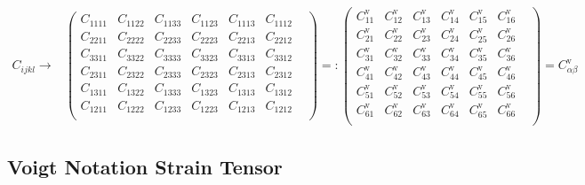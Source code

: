 \documentclass[a4paper, 10pt]{scrartcl}
\begin{document}
	\begin{align} C_{ijkl} \longrightarrow& \begin{pmatrix} C_{1111} & C_{1122} &
			C_{1133} & C_{1123} & C_{1113} & C_{1112} & \\ C_{2211} & C_{2222} & C_{2233} &
			C_{2223} & C_{2213} & C_{2212} & \\ C_{3311} & C_{3322} & C_{3333} & C_{3323} &
			C_{3313} & C_{3312} & \\ C_{2311} & C_{2322} & C_{2333} & C_{2323} & C_{2313} &
			C_{2312} & \\ C_{1311} & C_{1322} & C_{1333} & C_{1323} & C_{1313} & C_{1312} &
			\\ C_{1211} & C_{1222} & C_{1233} & C_{1223} & C_{1213} & C_{1212} & \\
		\end{pmatrix}=: \begin{pmatrix} C_{11}^{\text{v}} & C_{12}^{\text{v}} &
		C_{13}^{\text{v}} & C_{14}^{\text{v}} & C_{15}^{\text{v}} & C_{16}^{\text{v}} &
		\\ C_{21}^{\text{v}} & C_{22}^{\text{v}} & C_{23}^{\text{v}} & C_{24}^{\text{v}}
		&  C_{25}^{\text{v}} & C_{26}^{\text{v}} & \\ C_{31}^{\text{v}} &
		C_{32}^{\text{v}}  & C_{33}^{\text{v}} & C_{34}^{\text{v}} & C_{35}^{\text{v}} &
		C_{36}^{\text{v}} & \\ C_{41}^{\text{v}} & C_{42}^{\text{v}} & C_{43}^{\text{v}}
		& C_{44}^{\text{v}} & C_{45}^{\text{v}} & C_{46}^{\text{v}} & \\
		C_{51}^{\text{v}}  & C_{52}^{\text{v}} & C_{53}^{\text{v}} & C_{54}^{\text{v}} &
		C_{55}^{\text{v}} & C_{56}^{\text{v}} & \\ C_{61}^{\text{v}} & C_{62}^{\text{v}}
		& C_{63}^{\text{v}} & C_{64}^{\text{v}} & C_{65}^{\text{v}} & C_{66}^{\text{v}}
		&  \\ \end{pmatrix} =C^{\text{v}}_{\alpha\beta} \end{align}

\subsection{Voigt Notation Strain Tensor}
\end{document}
